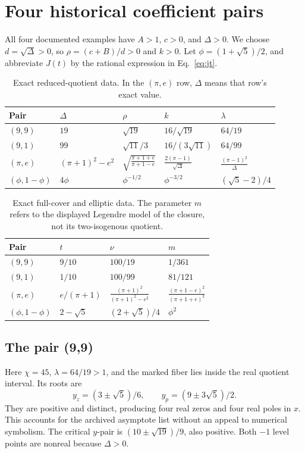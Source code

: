 \section{Four historical coefficient pairs}\label{sec:examples}

All four documented examples have \(A>1\), \(c>0\), and \(\Delta>0\). We choose \(d=\sqrt\Delta>0\), so \(\rho=(c+B)/d>0\) and \(k>0\). Let \(\phi=(1+\sqrt5)/2\), and abbreviate \(J(t)\) by the rational expression in Eq.~\eqref{eq:jt}.

\begin{table}[htbp]\centering\small
\begin{tabular}{lllll}\toprule
Pair & \(\Delta\) & \(\rho\) & \(k\) & \(\lambda\)\\\midrule
\((9,9)\) & \(19\) & \(\sqrt{19}\) & \(16/\sqrt{19}\) & \(64/19\)\\
\((9,1)\) & \(99\) & \(\sqrt{11}/3\) & \(16/(3\sqrt{11})\) & \(64/99\)\\
\((\pi,e)\) & \((\pi+1)^2-e^2\) & \(\sqrt{\frac{\pi+1+e}{\pi+1-e}}\) & \(\frac{2(\pi-1)}{\sqrt\Delta}\) & \(\frac{(\pi-1)^2}{\Delta}\)\\
\((\phi,1-\phi)\) & \(4\phi\) & \(\phi^{-1/2}\) & \(\phi^{-3/2}\) & \((\sqrt5-2)/4\)\\\bottomrule
\end{tabular}\caption{Exact reduced-quotient data. In the \((\pi,e)\) row, \(\Delta\) means that row's exact value.}\label{tab:examples1}
\end{table}

\begin{table}[htbp]\centering\small
\begin{tabular}{llll}\toprule
Pair & \(t\) & \(\nu\) & \(m\)\\\midrule
\((9,9)\) & \(9/10\) & \(100/19\) & \(1/361\)\\
\((9,1)\) & \(1/10\) & \(100/99\) & \(81/121\)\\
\((\pi,e)\) & \(e/(\pi+1)\) & \(\frac{(\pi+1)^2}{(\pi+1)^2-e^2}\) & \(\frac{(\pi+1-e)^2}{(\pi+1+e)^2}\)\\
\((\phi,1-\phi)\) & \(2-\sqrt5\) & \((2+\sqrt5)/4\) & \(\phi^2\)\\\bottomrule
\end{tabular}\caption{Exact full-cover and elliptic data. The parameter \(m\) refers to the displayed Legendre model of the closure, not its two-isogenous quotient.}\label{tab:examples2}
\end{table}

\subsection{The pair (9,9)}
Here \(\chi=45\), \(\lambda=64/19>1\), and the marked fiber lies inside the real quotient interval. Its roots are
\[
y_z=(3\pm\sqrt5)/6,\qquad y_p=(9\pm3\sqrt5)/2.
\]
They are positive and distinct, producing four real zeros and four real poles in \(x\). This accounts for the archived asymptote list without an appeal to numerical symbolism. The critical \(y\)-pair is \((10\pm\sqrt{19})/9\), also positive. Both \(-1\) level points are nonreal because \(\Delta>0\).

